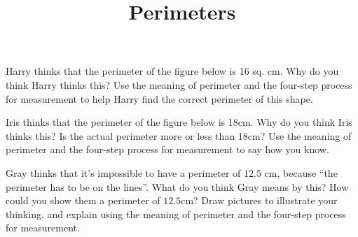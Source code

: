\documentclass{ximera}
\title{Perimeters}
\begin{document}
\begin{abstract}  \end{abstract}
\maketitle



\begin{problem}
Harry thinks that the perimeter of the figure below is 16 sq. cm. Why do you think Harry thinks this? Use the meaning of perimeter and the four-step process for measurement to help Harry find the correct perimeter of this shape.
\begin{center}
\end{center}
\end{problem}
\newpage

\begin{problem}
Iris thinks that the perimeter of the figure below is 18cm. Why do you think Iris thinks this? Is the actual perimeter more or less than 18cm? Use the meaning of perimeter and the four-step process for measurement to say how you know.
\begin{center}
\end{center}
\end{problem}

\begin{problem}
Gray thinks that it's impossible to have a perimeter of $12.5$ cm, because ``the perimeter has to be on the lines''. What do you think Gray means by this? How could you show them a perimeter of $12.5$cm? Draw pictures to illustrate your thinking, and explain using the meaning of perimeter and the four-step process for measurement.
\end{problem}



\newpage
\end{document}
